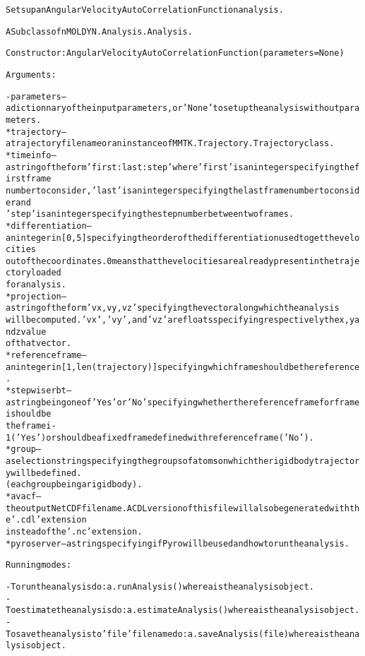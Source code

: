 \begin{alltt}
Sets up an Angular Velocity AutoCorrelation Function analysis.

A Subclass of nMOLDYN.Analysis.Analysis. 

Constructor: AngularVelocityAutoCorrelationFunction({\textbar}parameters{\textbar} = None)

Arguments:

    - {\textbar}parameters{\textbar} -- a dictionnary of the input parameters, or 'None' to set up the analysis without parameters.
        * trajectory      -- a trajectory file name or an instance of MMTK.Trajectory.Trajectory class.
        * timeinfo        -- a string of the form 'first:last:step' where 'first' is an integer specifying the first frame 
                             number to consider, 'last' is an integer specifying the last frame number to consider and 
                             'step' is an integer specifying the step number between two frames.
        * differentiation -- an integer in [0,5] specifying the order of the differentiation used to get the velocities
                             out of the coordinates. 0 means that the velocities are already present in the trajectory loaded
                             for analysis.
        * projection      -- a string of the form 'vx,vy,vz' specifying the vector along which the analysis
                             will be computed. 'vx', 'vy', and 'vz' are floats specifying respectively the x, y and z value 
                             of that vector.
        * referenceframe  -- an integer in [1,len(trajectory)] specifying which frame should be the reference.
        * stepwiserbt     -- a string being one of 'Yes' or 'No' specifying whether the reference frame for frame i should be 
                             the frame i - 1 ('Yes') or should be a fixed frame defined with {\textbar}referenceframe{\textbar} ('No').
        * group           -- a selection string specifying the groups of atoms on which the rigid body trajectory will be defined.
                             (each group being a rigid body).
        * avacf           -- the output NetCDF file name. A CDL version of this file will also be generated with the '.cdl' extension
                             instead of the '.nc' extension.
        * pyroserver      -- a string specifying if Pyro will be used and how to run the analysis.
    
Running modes:

    - To run the analysis do: a.runAnalysis() where a is the analysis object.
    - To estimate the analysis do: a.estimateAnalysis() where a is the analysis object.
    - To save the analysis to 'file' file name do: a.saveAnalysis(file) where a is the analysis object.
\end{alltt}


